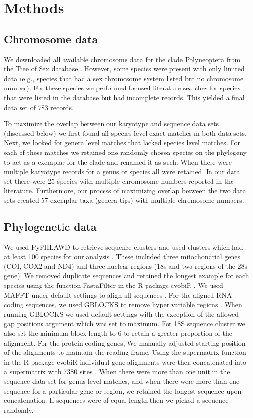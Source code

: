 
\section{Methods}

\subsection{Chromosome data}
We downloaded all available chromosome data for the clade Polyneoptera from the Tree of Sex database \citep{blackmon2016,TOS2014}.
However, some species were present with only limited data (e.g., species that had a sex chromosome system listed but no chromosome number). 
For these species we performed focused literature searches for species that were listed in the database but had incomplete records.
This yielded a final data set of 783 records. 

To maximize the overlap between our karyotype and sequence data sets (discussed below) we first found all species level exact matches in both data sets.
Next, we looked for genera level matches that lacked species level matches.
For each of these matches we retained one randomly chosen species on the phylogeny to act as a exemplar for the clade and renamed it as such. 
When there were multiple karyotype records for a genus or species all were retained.
In our data set there were 25 species with multiple chromosome numbers reported in the literature.
Furthermore, our process of maximizing overlap between the two data sets created 57 exemplar taxa (genera tips) with multiple chromosome numbers.

\subsection{Phylogenetic data}
We used PyPHLAWD to retrieve sequence clusters and used clusters which had at least 100 species for our analysis \citep{smith2018phyphlawd}. 
These included three mitochondrial genes (COI, COX2 and ND4) and three nuclear regions (18s and two regions of the 28s gene). 
We removed duplicate sequences and retained the longest example for each species using the function FastaFilter in the R package evobiR \citep{blackmon2013EvoBiR}.
We used MAFFT under default settings to align all sequences \citep{katoh2013mafft}.
For the aligned RNA coding sequences, we used GBLOCKS to remove hyper variable regions \citep{castresana2000gblocks}. 
When running GBLOCKS we used default settings with the exception of the allowed gap positions argument which was set to maximum. 
For 18S sequence cluster we also set the minimum block length to 6 to retain a greater proportion of the alignment. 
For the protein coding genes, We manually adjusted starting position of the alignments to maintain the reading frame. 
Using the supermatrix function in the R package evobiR individual gene alignments were then concatenated into a supermatrix with 7380 sites \citep{blackmon2013EvoBiR}.
When there were more than one unit in the sequence data set for genus level matches, and when there were more than one sequence for a particular gene or region, we retained the longest sequence upon concatenation. If sequences were of equal length then we picked a sequence randomly.

